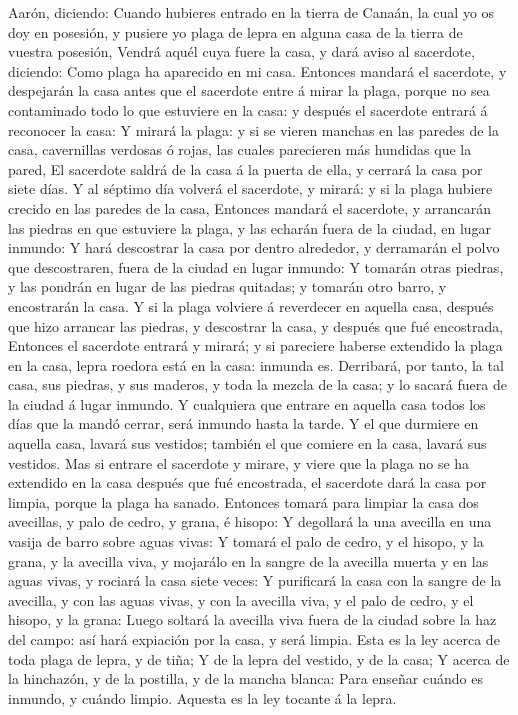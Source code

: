 Aarón, diciendo:  Cuando hubieres entrado en la tierra de
Canaán, la cual yo os doy en posesión, y pusiere yo plaga de lepra en
alguna casa de la tierra de vuestra posesión,  Vendrá
aquél cuya fuere la casa, y dará aviso al sacerdote, diciendo: Como
plaga ha aparecido en mi casa.  Entonces mandará el
sacerdote, y despejarán la casa antes que el sacerdote entre á mirar la
plaga, porque no sea contaminado todo lo que estuviere en la casa: y
después el sacerdote entrará á reconocer la casa:  Y
mirará la plaga: y si se vieren manchas en las paredes de la casa,
cavernillas verdosas ó rojas, las cuales parecieren más hundidas que la
pared,  El sacerdote saldrá de la casa á la puerta de
ella, y cerrará la casa por siete días.  Y al séptimo día
volverá el sacerdote, y mirará: y si la plaga hubiere crecido en las
paredes de la casa,  Entonces mandará el sacerdote, y
arrancarán las piedras en que estuviere la plaga, y las echarán fuera de
la ciudad, en lugar inmundo:  Y hará descostrar la casa
por dentro alrededor, y derramarán el polvo que descostraren, fuera de
la ciudad en lugar inmundo:  Y tomarán otras piedras, y
las pondrán en lugar de las piedras quitadas; y tomarán otro barro, y
encostrarán la casa.  Y si la plaga volviere á reverdecer
en aquella casa, después que hizo arrancar las piedras, y descostrar la
casa, y después que fué encostrada,  Entonces el
sacerdote entrará y mirará; y si pareciere haberse extendido la plaga en
la casa, lepra roedora está en la casa: inmunda es. 
Derribará, por tanto, la tal casa, sus piedras, y sus maderos, y toda la
mezcla de la casa; y lo sacará fuera de la ciudad á lugar inmundo.
 Y cualquiera que entrare en aquella casa todos los días
que la mandó cerrar, será inmundo hasta la tarde.  Y el
que durmiere en aquella casa, lavará sus vestidos; también el que
comiere en la casa, lavará sus vestidos.  Mas si entrare
el sacerdote y mirare, y viere que la plaga no se ha extendido en la
casa después que fué encostrada, el sacerdote dará la casa por limpia,
porque la plaga ha sanado.  Entonces tomará para limpiar
la casa dos avecillas, y palo de cedro, y grana, é hisopo:
 Y degollará la una avecilla en una vasija de barro sobre
aguas vivas:  Y tomará el palo de cedro, y el hisopo, y
la grana, y la avecilla viva, y mojarálo en la sangre de la avecilla
muerta y en las aguas vivas, y rociará la casa siete veces:
 Y purificará la casa con la sangre de la avecilla, y con
las aguas vivas, y con la avecilla viva, y el palo de cedro, y el
hisopo, y la grana:  Luego soltará la avecilla viva fuera
de la ciudad sobre la haz del campo: así hará expiación por la casa, y
será limpia.  Esta es la ley acerca de toda plaga de
lepra, y de tiña;  Y de la lepra del vestido, y de la
casa;  Y acerca de la hinchazón, y de la postilla, y de
la mancha blanca:  Para enseñar cuándo es inmundo, y
cuándo limpio. Aquesta es la ley tocante á la lepra.

